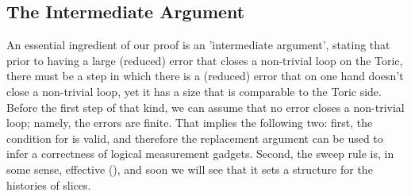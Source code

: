 
\subsection{The Intermediate Argument} 
  An essential ingredient of our proof is an 'intermediate argument', stating that prior to having a large (reduced) error that closes a non-trivial loop on the Toric, there must be a step in which there is a (reduced) error that on one hand doesn't close a non-trivial loop, yet it has a size that is comparable to the Toric side. Before the first step of that kind, we can assume that no error closes a non-trivial loop; namely, the errors are finite. That implies the following two: first, the condition for  is valid, and therefore the replacement argument can be used to infer a correctness of logical measurement gadgets. Second, the sweep rule is, in some sense, effective (), and soon we will see that it sets a structure for the histories of slices. 








